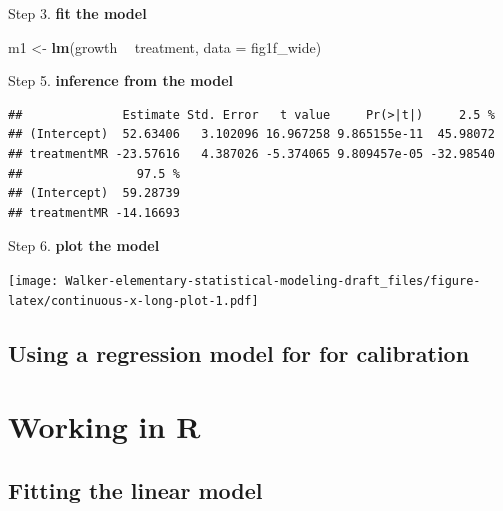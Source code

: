 \documentclass[]{book}
\newenvironment{Shaded}{\begin{snugshade}}{\end{snugshade}}
\newcommand{\DataTypeTok}[1]{\textcolor[rgb]{0.13,0.29,0.53}{#1}}
\newcommand{\KeywordTok}[1]{\textcolor[rgb]{0.13,0.29,0.53}{\textbf{#1}}}
\newcommand{\NormalTok}[1]{#1}
\newcommand{\OperatorTok}[1]{\textcolor[rgb]{0.81,0.36,0.00}{\textbf{#1}}}
\newcommand{\StringTok}[1]{\textcolor[rgb]{0.31,0.60,0.02}{#1}}
\begin{document}
Step 3. \textbf{fit the model}

\begin{Shaded}
\begin{Highlighting}[]
\NormalTok{m1 <-}\StringTok{ }\KeywordTok{lm}\NormalTok{(growth }\OperatorTok{~}\StringTok{ }\NormalTok{treatment, }\DataTypeTok{data =}\NormalTok{ fig1f_wide)}
\end{Highlighting}
\end{Shaded}

Step 5. \textbf{inference from the model}

\begin{Shaded}
\end{Shaded}

\begin{verbatim}
##              Estimate Std. Error   t value     Pr(>|t|)     2.5 %
## (Intercept)  52.63406   3.102096 16.967258 9.865155e-11  45.98072
## treatmentMR -23.57616   4.387026 -5.374065 9.809457e-05 -32.98540
##                97.5 %
## (Intercept)  59.28739
## treatmentMR -14.16693
\end{verbatim}

Step 6. \textbf{plot the model}

\texttt{[image: Walker-elementary-statistical-modeling-draft\_files/figure-latex/continuous-x-long-plot-1.pdf]}

\hypertarget{using-a-regression-model-for-for-calibration}{%
\subsection{Using a regression model for for calibration}\label{using-a-regression-model-for-for-calibration}}

\hypertarget{working-in-r}{%
\section{Working in R}\label{working-in-r}}

\hypertarget{fitting-the-linear-model}{%
\subsection{Fitting the linear model}\label{fitting-the-linear-model}}
\end{document}

